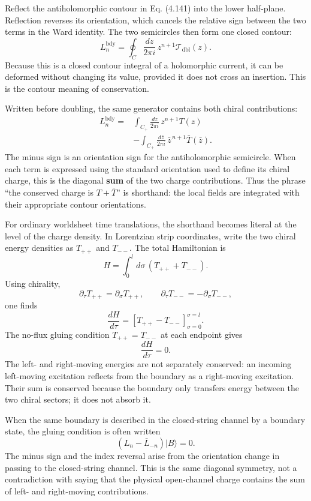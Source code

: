\documentclass[
  10pt,
  a4paper,
  openany]{book}
\begin{document}
Reflect the antiholomorphic contour in Eq. (4.141) into the lower
half-plane. Reflection reverses its orientation, which cancels the
relative sign between the two terms in the Ward identity. The two
semicircles then form one closed contour: \[
L_n^{\mathrm{bdy}}
=
\oint_C\frac{dz}{2\pi i}\,
z^{n+1}\mathcal T_{\mathrm{dbl}}(z).
\] Because this is a closed contour integral of a holomorphic current,
it can be deformed without changing its value, provided it does not
cross an insertion. This is the contour meaning of conservation.

Written before doubling, the same generator contains both chiral
contributions: \[
\begin{aligned}
L_n^{\mathrm{bdy}}
={}&
\int_{C_+}\frac{dz}{2\pi i}\,
z^{n+1}T(z)\\%
&-
\int_{C_+}\frac{d\bar z}{2\pi i}\,
\bar z^{\,n+1}\bar T(\bar z).
\end{aligned}
\] The minus sign is an orientation sign for the antiholomorphic
semicircle. When each term is expressed using the standard orientation
used to define its chiral charge, this is the diagonal \textbf{sum} of
the two charge contributions. Thus the phrase ``the conserved charge is
\(T+\bar T\)'' is shorthand: the local fields are integrated with their
appropriate contour orientations.

For ordinary worldsheet time translations, the shorthand becomes literal
at the level of the charge density. In Lorentzian strip coordinates,
write the two chiral energy densities as \(T_{++}\) and \(T_{--}\). The
total Hamiltonian is \[
H
=
\int_0^l d\sigma\,
\left(
T_{++}+T_{--}
\right).
\] Using chirality, \[
\partial_\tau T_{++}
=\partial_\sigma T_{++},
\qquad
\partial_\tau T_{--}
=-\partial_\sigma T_{--},
\] one finds \[
\frac{dH}{d\tau}
=
\left[
T_{++}-T_{--}
\right]_{\sigma=0}^{\sigma=l}.
\] The no-flux gluing condition \(T_{++}=T_{--}\) at each endpoint gives
\[
\frac{dH}{d\tau}=0.
\] The left- and right-moving energies are not separately conserved: an
incoming left-moving excitation reflects from the boundary as a
right-moving excitation. Their sum is conserved because the boundary
only transfers energy between the two chiral sectors; it does not absorb
it.

When the same boundary is described in the closed-string channel by a
boundary state, the gluing condition is often written \[
\left(
L_n-\bar L_{-n}
\right)|B\rangle=0.
\] The minus sign and the index reversal arise from the orientation
change in passing to the closed-string channel. This is the same
diagonal symmetry, not a contradiction with saying that the physical
open-channel charge contains the sum of left- and right-moving
contributions.
\end{document}
